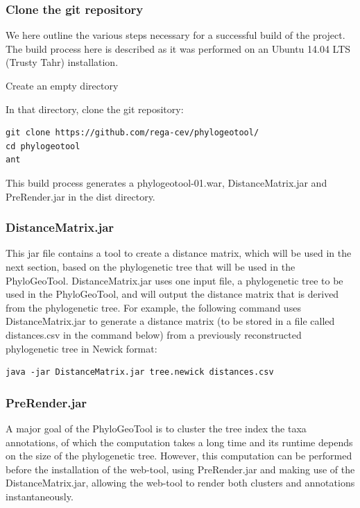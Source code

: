 \documentclass[a4paper, 11pt]{article} %
\begin{document}
\subsubsection{Clone the git repository}
We here outline the various steps necessary for a successful build of the project.
The build process here is described as it was performed on an Ubuntu 14.04 LTS (Trusty Tahr) installation.
\begin{itemize}
\item Create an empty directory
\item {In that directory, clone the git repository: 
\begin{verbatim}
git clone https://github.com/rega-cev/phylogeotool/
cd phylogeotool
ant
\end{verbatim}
\item This build process generates a phylogeotool-01.war, DistanceMatrix.jar and PreRender.jar in the dist directory.
}
\end{itemize}


\subsubsection{DistanceMatrix.jar}
\label{sec:dm}
This jar file contains a tool to create a distance matrix, which will be used in the next section, based on the phylogenetic tree that will be used in the PhyloGeoTool.
DistanceMatrix.jar uses one input file, a phylogenetic tree to be used in the PhyloGeoTool, and will output the distance matrix that is derived from the phylogenetic tree.
For example, the following command uses DistanceMatrix.jar to generate a distance matrix (to be stored in a file called distances.csv in the command below) from a previously reconstructed phylogenetic tree in Newick format: 
\begin{verbatim}
java -jar DistanceMatrix.jar tree.newick distances.csv
\end{verbatim}


\subsubsection{PreRender.jar}
A major goal of the PhyloGeoTool is to cluster the tree index the taxa annotations, of which the computation takes a long time and its runtime depends on the size of the phylogenetic tree. 
However, this computation can be performed before the installation of the web-tool, using PreRender.jar and making use of the DistanceMatrix.jar, allowing the web-tool to render both clusters and annotations instantaneously.
\end{document}
